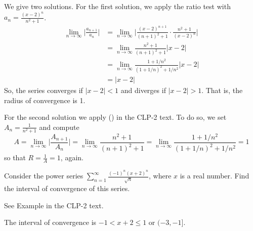 \begin{solution}
We give two solutions. For the first solution, we apply the ratio test with $a_n = \frac{(x - 2)^n}{n^2+1}$.
\begin{align*}
\lim_{n\rightarrow\infty}\Big|\frac{a_{n+1}}{a_n}\Big|
&=\lim_{n\rightarrow\infty}\bigg|\frac{(x-2)^{n+1}}{(n+1)^2+1}\cdot
                               \frac{n^2+1}{(x-2)^n}\bigg|\\
&=\lim_{n\rightarrow\infty}\frac{n^2+1}{(n+1)^2+1}
                               |x-2|\\
&=\lim_{n\rightarrow\infty}\frac{1+1/n^2}{(1+1/n)^2+1/n^2}
                               |x-2|\\
&=|x-2|
\end{align*}
So, the series converges if $|x-2|<1$ and diverges if $|x-2|>1$.
That is, the radius of convergence is 1.

For the second solution we apply () in the CLP-2 text. To do so, we set 
$A_n = \frac{1}{n^2+1}$ and compute
\begin{equation*}
A = \lim_{n\to\infty} \bigg| \frac{A_{n+1}}{A_n}\bigg|
  = \lim_{n\to\infty}  \frac{n^2+1}{(n+1)^2+1}
  = \lim_{n\to\infty} \frac{1+1/n^2}{(1+1/n)^2+1/n^2}
  =1
\end{equation*}
so that $R=\frac{1}{A}=1$, again.
\end{solution}


\begin{question}[2013A]
 Consider the power series
 $\displaystyle\sum\limits_{n=1}^\infty \frac{(-1)^n(x+2)^n}{\sqrt{n}}$,
where $x$ is a real number. Find the interval of
convergence of this series.
\end{question}

\begin{hint}
See Example  in the
CLP-2 text.
\end{hint}

\begin{answer}
The interval of convergence
is $-1<x+2\le 1$ or $(-3,-1]$.
\end{answer}

